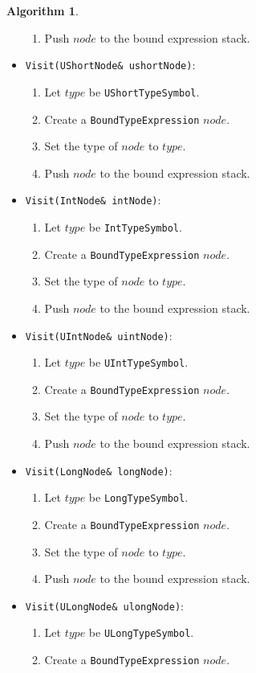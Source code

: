 \documentclass[a4paper,oneside,11pt]{book}
\theoremstyle{definition}
\newtheorem{algo}{Algorithm}[section]
\begin{document}
\begin{algo}
\begin{itemize}
\begin{enumerate}
\item
Push $node$ to the bound expression stack.
\end{enumerate}
\item
\verb|Visit(UShortNode& ushortNode)|:
\begin{enumerate}
\item
Let $type$ be \verb|UShortTypeSymbol|.
\item
Create a \verb|BoundTypeExpression| $node$.
\item
Set the type of $node$ to $type$.
\item
Push $node$ to the bound expression stack.
\end{enumerate}
\item
\verb|Visit(IntNode& intNode)|:
\begin{enumerate}
\item
Let $type$ be \verb|IntTypeSymbol|.
\item
Create a \verb|BoundTypeExpression| $node$.
\item
Set the type of $node$ to $type$.
\item
Push $node$ to the bound expression stack.
\end{enumerate}
\item
\verb|Visit(UIntNode& uintNode)|:
\begin{enumerate}
\item
Let $type$ be \verb|UIntTypeSymbol|.
\item
Create a \verb|BoundTypeExpression| $node$.
\item
Set the type of $node$ to $type$.
\item
Push $node$ to the bound expression stack.
\end{enumerate}
\item
\verb|Visit(LongNode& longNode)|:
\begin{enumerate}
\item
Let $type$ be \verb|LongTypeSymbol|.
\item
Create a \verb|BoundTypeExpression| $node$.
\item
Set the type of $node$ to $type$.
\item
Push $node$ to the bound expression stack.
\end{enumerate}
\item
\verb|Visit(ULongNode& ulongNode)|:
\begin{enumerate}
\item
Let $type$ be \verb|ULongTypeSymbol|.
\item
Create a \verb|BoundTypeExpression| $node$.

\end{enumerate}
\end{itemize}
\end{algo}
\end{document}
